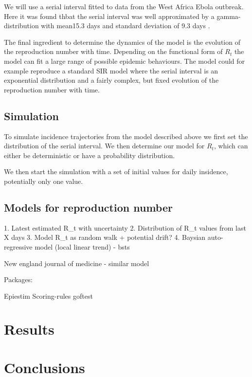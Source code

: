 \documentclass[12pt]{article}
\begin{document}
We will use a serial interval fitted to data from the West Africa Ebola outbreak. Here it was found thbat the serial interval was well approximated by a gamma-distribution with  mean15.3 days and standard deviation of 9.3 days \cite{EbolaVirusDisease2014}.

The final ingredient to determine the dynamics of the model is the evolution of the reproduction number with time. Depending on the functional form of $R_t$ the model can fit a large range of possible epidemic behaviours. The model could for example reproduce a standard SIR model where the serial interval is an exponential distribution and a fairly complex, but fixed evolution of the reproduction number with time.

\subsection{Simulation}
To simulate incidence trajectories from the model described above we first set the distribution of the serial interval. We then determine our model for $R_t$, which can either be deterministic or have a probability distribution.

We then start the simulation with a set of initial values for daily insidence, potentially only one value.

\subsection{Models for reproduction number}

1. Latest estimated R_t with uncertainty
2. Distribution of R_t values from last X days
3. Model R_t as random walk + potential drift?
4. Baysian auto-regressive model (local linear trend) - bsts

New england journal of medicine - similar model



Packages:

Epiestim
Scoring-rules
goftest





\section{Results}

\section{Conclusions}

\newpage

 

\end{document}
